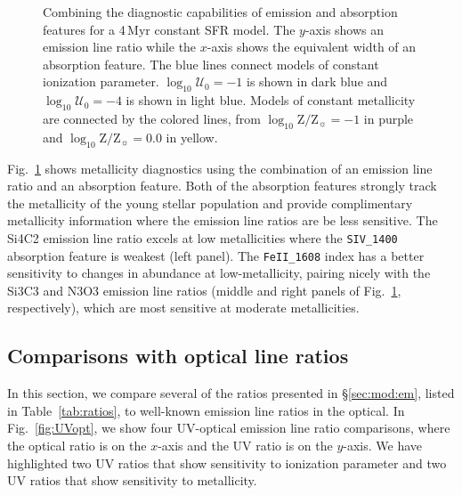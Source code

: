 \documentclass[preprint2]{aastex61}
\newcommand{\Myr}{$\,$Myr\xspace}
\newcommand{\logten}{\ensuremath{\log_{10}}}
\newcommand{\logZeq}[1]{\ensuremath{\logten \mathrm{Z}/\mathrm{Z}_{\sun} = #1}}
\newcommand{\logUeq}[1]{\ensuremath{\logten \mathcal{U}_0 = #1}}
\begin{document}
\begin{figure}
  \begin{center}
    \caption{Combining the diagnostic capabilities of emission and absorption features for a 4\Myr constant SFR model. The $y$-axis shows an emission line ratio while the $x$-axis shows the equivalent width of an absorption feature. The blue lines connect models of constant ionization parameter. \logUeq{-1} is shown in dark blue and \logUeq{-4} is shown in light blue. Models of constant metallicity are connected by the colored lines, from \logZeq{-1} in purple and \logZeq{0.0} in yellow.}
    \label{fig:AbsEm}
  \end{center}
\end{figure}


Fig.~\ref{fig:AbsEm} shows metallicity diagnostics using the combination of an emission line ratio and an absorption feature. Both of the absorption features strongly track the metallicity of the young stellar population and provide complimentary metallicity information where the emission line ratios are be less sensitive. The Si4C2 emission line ratio excels at low metallicities where the \texttt{SIV\_1400} absorption feature is weakest (left panel). The \texttt{FeII\_1608} index has a better sensitivity to changes in abundance at low-metallicity, pairing nicely with the Si3C3 and N3O3 emission line ratios (middle and right panels of Fig.~\ref{fig:AbsEm}, respectively), which are most sensitive at moderate metallicities. 

\subsection{Comparisons with optical line ratios} \label{sec:mod:opt}

In this section, we compare several of the ratios presented in \S\ref{sec:mod:em}, listed in Table~\ref{tab:ratios}, to well-known emission line ratios in the optical. In Fig.~\ref{fig:UVopt}, we show four UV-optical emission line ratio comparisons, where the optical ratio is on the $x$-axis and the UV ratio is on the $y$-axis. We have highlighted two UV ratios that show sensitivity to ionization parameter and two UV ratios that show sensitivity to metallicity. 
\end{document}
